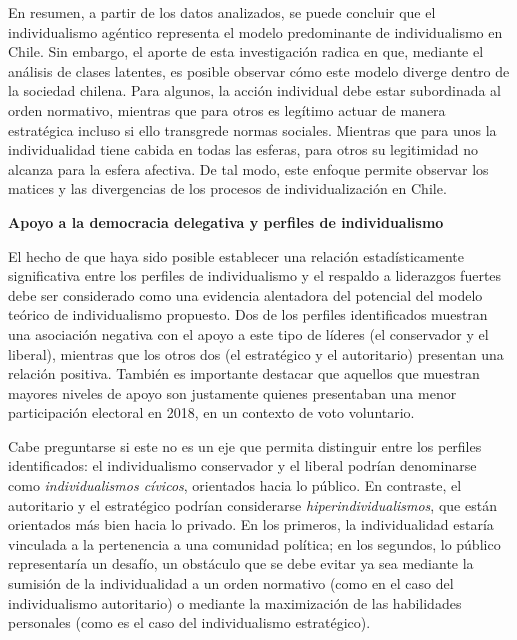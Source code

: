 \documentclass[12pt,oneside]{templates/facsothesis}
\begin{document}
En resumen, a partir de los datos analizados, se puede concluir que el individualismo agéntico \citep{araujo2020} representa el modelo predominante de individualismo en Chile. Sin embargo, el aporte de esta investigación radica en que, mediante el análisis de clases latentes, es posible observar cómo este modelo diverge dentro de la sociedad chilena. Para algunos, la acción individual debe estar subordinada al orden normativo, mientras que para otros es legítimo actuar de manera estratégica incluso si ello transgrede normas sociales. Mientras que para unos la individualidad tiene cabida en todas las esferas, para otros su legitimidad no alcanza para la esfera afectiva. De tal modo, este enfoque permite observar los matices y las divergencias de los procesos de individualización en Chile.

\textbf{Apoyo a la democracia delegativa y perfiles de individualismo}

El hecho de que haya sido posible establecer una relación estadísticamente significativa entre los perfiles de individualismo y el respaldo a liderazgos fuertes debe ser considerado como una evidencia alentadora del potencial del modelo teórico de individualismo propuesto. Dos de los perfiles identificados muestran una asociación negativa con el apoyo a este tipo de líderes (el conservador y el liberal), mientras que los otros dos (el estratégico y el autoritario) presentan una relación positiva. También es importante destacar que aquellos que muestran mayores niveles de apoyo son justamente quienes presentaban una menor participación electoral en 2018, en un contexto de voto voluntario.

Cabe preguntarse si este no es un eje que permita distinguir entre los perfiles identificados: el individualismo conservador y el liberal podrían denominarse como \emph{individualismos cívicos}, orientados hacia lo público. En contraste, el autoritario y el estratégico podrían considerarse \emph{hiperindividualismos}, que están orientados más bien hacia lo privado. En los primeros, la individualidad estaría vinculada a la pertenencia a una comunidad política; en los segundos, lo público representaría un desafío, un obstáculo que se debe evitar ya sea mediante la sumisión de la individualidad a un orden normativo (como en el caso del individualismo autoritario) o mediante la maximización de las habilidades personales (como es el caso del individualismo estratégico).
\end{document}
